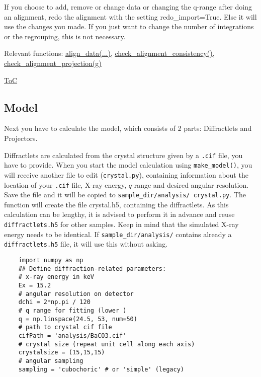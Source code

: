If you choose to add, remove or change data or changing the q-range after doing an alignment, redo the alignment with the
setting redo\_import=True.
Else it will use the changes you made. If you just want to change the number of integrations or the regrouping,
this is not necessary.

Relevant functions:
\hyperref[fun:aligndata]{align\_data(...)}, 
\hyperref[fun:checkalignmentconsistency]{check\_alignment\_consistency()},
\hyperref[fun:checkalignmentprojection]{check\_alignment\_projection(g)}

\begin{flushright}
    \hyperref[toc]{ToC}
\end{flushright}

\subsection{Model}
Next you have to calculate the model, which consists of 2 parts: Diffractlets and Projectors.

Diffractlets are calculated from the crystal structure given by a \texttt{.cif} file, you have to provide.
When you start the model calculation using \texttt{make\_model()}, you will receive another file to edit (\texttt{crystal.py}), containing
information about the location of your \texttt{.cif} file, X-ray energy, $q$-range and desired angular resolution.
Save the file and it will be copied to \texttt{sample\_dir/analysis/ crystal.py}.
The function will create the file crystal.h5, containing the diffractlets. As this calculation can be lengthy,
it is advised to perform it in advance and reuse \texttt{diffractlets.h5} for other samples. Keep in mind that the simulated X-ray energy needs to be identical.
If \texttt{sample\_dir/analysis/} contains already a \texttt{diffractlets.h5} file, it will use this without asking.

\begin{verbatim}
    import numpy as np
    ## Define diffraction-related parameters:
    # x-ray energy in keV
    Ex = 15.2
    # angular resolution on detector
    dchi = 2*np.pi / 120
    # q range for fitting (lower )
    q = np.linspace(24.5, 53, num=50)
    # path to crystal cif file
    cifPath = 'analysis/BaCO3.cif'
    # crystal size (repeat unit cell along each axis)
    crystalsize = (15,15,15)
    # angular sampling
    sampling = 'cubochoric' # or 'simple' (legacy)
\end{verbatim}

